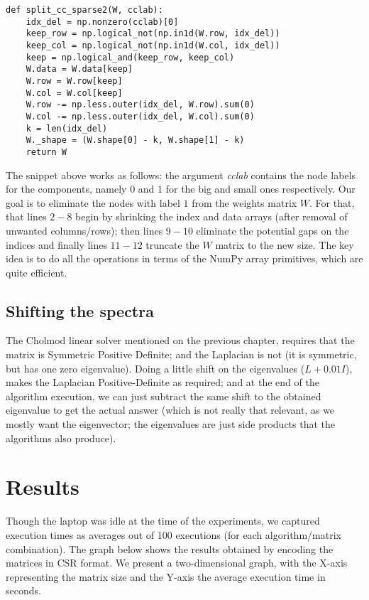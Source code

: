     \begin{lstlisting}
def split_cc_sparse2(W, cclab):
    idx_del = np.nonzero(cclab)[0]
    keep_row = np.logical_not(np.in1d(W.row, idx_del))
    keep_col = np.logical_not(np.in1d(W.col, idx_del))
    keep = np.logical_and(keep_row, keep_col)
    W.data = W.data[keep]
    W.row = W.row[keep]
    W.col = W.col[keep]
    W.row -= np.less.outer(idx_del, W.row).sum(0)
    W.col -= np.less.outer(idx_del, W.col).sum(0)
    k = len(idx_del)
    W._shape = (W.shape[0] - k, W.shape[1] - k)
    return W
    \end{lstlisting}
    \joinbelow{1cm}
    
The snippet above works as follows: the argument
\emph{cclab} contains the node labels for the components, namely $0$ and $1$
for the big and small ones respectively. Our goal is to eliminate the nodes with
label $1$ from the weights matrix $W$. For that, that lines $2-8$
begin by shrinking the index and data arrays (after removal of unwanted
columns/rows); then lines $9-10$ eliminate the potential gaps on the
indices and finally lines $11-12$ truncate the $W$ matrix to the new
size. The key idea is to do all the operations in terms of the NumPy
array primitives, which are quite efficient. 

\subsection{Shifting the spectra}

The Cholmod linear solver mentioned on the previous chapter, requires
that the matrix is Symmetric Positive Definite; and the Laplacian is
not (it is symmetric, but has
one zero eigenvalue). Doing a little shift on the eigenvalues ($L +
0.01I$), makes the Laplacian Positive-Definite as required; and at the
end of the algorithm execution, we can just subtract the same shift to
the obtained eigenvalue to get the actual answer (which is not really
that relevant, as we mostly want the eigenvector; the eigenvalues are
just side products that the algorithms also produce). 

\section{Results}

Though the laptop was idle at the time of the experiments, we captured
execution times as averages out of 100 executions (for each
algorithm/matrix combination). The graph below shows the results
obtained by encoding the matrices in CSR format. We present a
two-dimensional graph, with the X-axis representing the matrix size
and the Y-axis the average execution time in seconds. 

